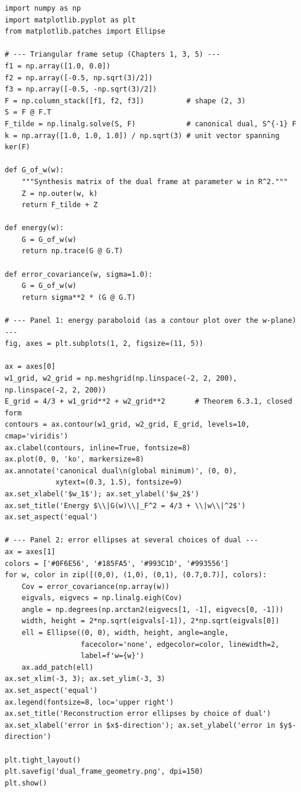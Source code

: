 \begin{lstlisting}[caption={The energy paraboloid and error ellipses, reproduced in Matplotlib}]
import numpy as np
import matplotlib.pyplot as plt
from matplotlib.patches import Ellipse

# --- Triangular frame setup (Chapters 1, 3, 5) ---
f1 = np.array([1.0, 0.0])
f2 = np.array([-0.5, np.sqrt(3)/2])
f3 = np.array([-0.5, -np.sqrt(3)/2])
F = np.column_stack([f1, f2, f3])          # shape (2, 3)
S = F @ F.T
F_tilde = np.linalg.solve(S, F)            # canonical dual, S^{-1} F
k = np.array([1.0, 1.0, 1.0]) / np.sqrt(3) # unit vector spanning ker(F)

def G_of_w(w):
    """Synthesis matrix of the dual frame at parameter w in R^2."""
    Z = np.outer(w, k)
    return F_tilde + Z

def energy(w):
    G = G_of_w(w)
    return np.trace(G @ G.T)

def error_covariance(w, sigma=1.0):
    G = G_of_w(w)
    return sigma**2 * (G @ G.T)

# --- Panel 1: energy paraboloid (as a contour plot over the w-plane) ---
fig, axes = plt.subplots(1, 2, figsize=(11, 5))

ax = axes[0]
w1_grid, w2_grid = np.meshgrid(np.linspace(-2, 2, 200), np.linspace(-2, 2, 200))
E_grid = 4/3 + w1_grid**2 + w2_grid**2       # Theorem 6.3.1, closed form
contours = ax.contour(w1_grid, w2_grid, E_grid, levels=10, cmap='viridis')
ax.clabel(contours, inline=True, fontsize=8)
ax.plot(0, 0, 'ko', markersize=8)
ax.annotate('canonical dual\n(global minimum)', (0, 0),
            xytext=(0.3, 1.5), fontsize=9)
ax.set_xlabel('$w_1$'); ax.set_ylabel('$w_2$')
ax.set_title('Energy $\\|G(w)\\|_F^2 = 4/3 + \\|w\\|^2$')
ax.set_aspect('equal')

# --- Panel 2: error ellipses at several choices of dual ---
ax = axes[1]
colors = ['#0F6E56', '#185FA5', '#993C1D', '#993556']
for w, color in zip([(0,0), (1,0), (0,1), (0.7,0.7)], colors):
    Cov = error_covariance(np.array(w))
    eigvals, eigvecs = np.linalg.eigh(Cov)
    angle = np.degrees(np.arctan2(eigvecs[1, -1], eigvecs[0, -1]))
    width, height = 2*np.sqrt(eigvals[-1]), 2*np.sqrt(eigvals[0])
    ell = Ellipse((0, 0), width, height, angle=angle,
                  facecolor='none', edgecolor=color, linewidth=2,
                  label=f'w={w}')
    ax.add_patch(ell)
ax.set_xlim(-3, 3); ax.set_ylim(-3, 3)
ax.set_aspect('equal')
ax.legend(fontsize=8, loc='upper right')
ax.set_title('Reconstruction error ellipses by choice of dual')
ax.set_xlabel('error in $x$-direction'); ax.set_ylabel('error in $y$-direction')

plt.tight_layout()
plt.savefig('dual_frame_geometry.png', dpi=150)
plt.show()
\end{lstlisting}

